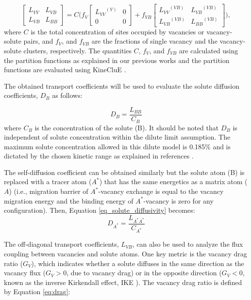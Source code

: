 \documentclass[preprint,12pt]{elsarticle}
\begin{document}
\begin{equation}
\label{eq_cluster_exp}
\begin{bmatrix}
L_{VV} & L_{VB} \\
L_{VB} & L_{BB}
\end{bmatrix}
=
C \Biggl(
f_V 
\begin{bmatrix}
{L_{VV}}^{(V)} & 0 \\
0 & 0 
\end{bmatrix}
+ f_{VB}
\begin{bmatrix}
{L_{VV}}^{(VB)} & {L_{VB}}^{(VB)} \\
{L_{VB}}^{(VB)} & {L_{BB}}^{(VB)}
\end{bmatrix}
\Biggr),
\end{equation}
where $C$ is the total concentration of sites occupied by vacancies or vacancy-solute pairs, and $f_V$, and $f_{VB}$ are the fractions of single vacancy and the vacancy-solute clusters, respectively. The quantities $C$, $f_V$, and $f_{VB}$ are calculated using the partition functions as explained in our previous works \cite{shousha2024first, shousha_vacancy-mediated_2024} and the partition functions are evaluated using KineCluE \citep{schuler_kineclue_2020}.

The obtained transport coefficients will be used to evaluate the solute diffusion coefficients, $D_B$ as follows:

\begin{equation}
\label{eq_solute_diffusivity}
    D_B = \frac{L_{BB}}{C_B}
\end{equation}
where $C_B$ is the concentration of the solute (B). It should be noted that $D_B$ is independent of solute concentration within the dilute limit assumption. The maximum solute concentration allowed in this dilute model is 0.185$\%$ and is dictated by the chosen kinetic range as explained in references \cite{messina_solute_2020,shousha_vacancy-mediated_2024,shousha2024first}.

The self-diffusion coefficient can be obtained similarly but the solute atom (B) is replaced with a tracer atom ($A^*$) that has the same energetics as a matrix atom ($A$) (i.e., migration barrier of $A^*$-vacancy exchange is equal to the vacancy migration energy and the binding energy of $A^*$-vacancy is zero for any configuration). Then, Equation \ref{eq_solute_diffusivity} becomes:
\begin{equation}
    D_{A^*} = \frac{L_{A^*A^*}}{C_{A^*}}
\end{equation}

The off-diagonal transport coefficients, $L_{VB}$, can also be used to analyze the flux coupling between vacancies and solute atoms. One key metric is the vacancy drag ratio ($G_V$), which indicates whether a solute diffuses in the same direction as the vacancy flux ($G_V > 0$, due to vacancy drag) or in the opposite direction ($G_V < 0$, known as the inverse Kirkendall effect, IKE \citep{marwick_segregation_1978}). The vacancy drag ratio is defined by Equation \ref{eq:drag}:
\end{document}
